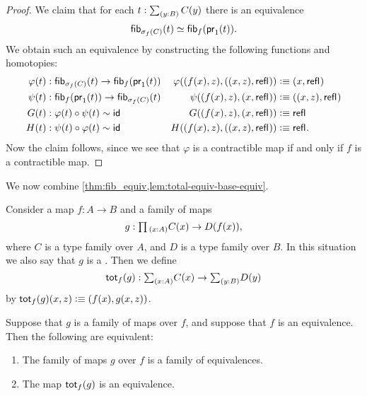 \begin{proof}
  We claim that for each $t:\sm{y:B}C(y)$ there is an equivalence
  \begin{equation*}
    \fib{\sigma_f(C)}{t}\simeq \fib{f}{\proj 1(t)}.
  \end{equation*}
  We obtain such an equivalence by constructing the following functions and homotopies:
  \begin{align*}
    \varphi(t) & : \fib{\sigma_f(C)}{t}\to\fib{f}{\proj 1 (t)} & \varphi((f(x),z),((x,z),\refl{})) & \defeq (x,\refl{}) \\
    \psi(t) & : \fib{f}{\proj 1(t)} \to\fib{\sigma_f(C)}{t} & \psi((f(x),z),(x,\refl{})) & \defeq ((x,z),\refl{}) \\
    G(t) & : \varphi(t)\circ\psi(t)\htpy\idfunc & G((f(x),z),(x,\refl{})) & \defeq \refl{} \\
    H(t) & : \psi(t)\circ\varphi(t)\htpy\idfunc & H((f(x),z),((x,z),\refl{})) & \defeq \refl{}.
  \end{align*}
  Now the claim follows, since we see that $\varphi$ is a contractible map if and only if $f$ is a contractible map.
\end{proof}

We now combine \cref{thm:fib_equiv,lem:total-equiv-base-equiv}.

\begin{defn}
  Consider a map $f:A\to B$ and a family of maps
  \begin{equation*}
    g:\prd{x:A}C(x)\to D(f(x)),
  \end{equation*}
  where $C$ is a type family over $A$, and $D$ is a type family over $B$. In this situation we also say that $g$ is a . Then we define
  \begin{equation*}
    \tot[f]{g}:\sm{x:A}C(x)\to\sm{y:B}D(y)
  \end{equation*}
  by $\tot[f]{g}(x,z)\defeq (f(x),g(x,z))$.
\end{defn}

\begin{thm}
  Suppose that $g$ is a family of maps over $f$, and suppose that $f$ is an equivalence. Then the following are equivalent:
  \begin{enumerate}
  \item The family of maps $g$ over $f$ is a family of equivalences.
  \item The map $\tot[f]{g}$ is an equivalence.
  \end{enumerate}
\end{thm}

